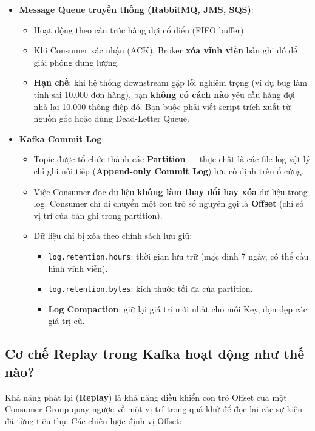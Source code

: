 \documentclass[12pt]{article}
\begin{document}
\begin{itemize}
    \item \textbf{Message Queue truyền thống (RabbitMQ, JMS, SQS)}:
    \begin{itemize}
        \item Hoạt động theo cấu trúc hàng đợi cổ điển (FIFO buffer).
        \item Khi Consumer xác nhận (ACK), Broker \textbf{xóa vĩnh viễn} bản ghi đó để giải phóng dung lượng.
        \item \textbf{Hạn chế}: khi hệ thống downstream gặp lỗi nghiêm trọng (ví dụ bug làm tính sai 10.000 đơn hàng), bạn \textbf{không có cách nào} yêu cầu hàng đợi nhả lại 10.000 thông điệp đó. Bạn buộc phải viết script trích xuất từ nguồn gốc hoặc dùng Dead-Letter Queue.
    \end{itemize}
    \item \textbf{Kafka Commit Log}:
    \begin{itemize}
        \item Topic được tổ chức thành các \textbf{Partition} --- thực chất là các file log vật lý chỉ ghi nối tiếp (\textbf{Append-only Commit Log}) lưu cố định trên ổ cứng.
        \item Việc Consumer đọc dữ liệu \textbf{không làm thay đổi hay xóa} dữ liệu trong log. Consumer chỉ di chuyển một con trỏ số nguyên gọi là \textbf{Offset} (chỉ số vị trí của bản ghi trong partition).
        \item Dữ liệu chỉ bị xóa theo chính sách lưu giữ:
        \begin{itemize}
            \item \texttt{log.retention.hours}: thời gian lưu trữ (mặc định 7 ngày, có thể cấu hình vĩnh viễn).
            \item \texttt{log.retention.bytes}: kích thước tối đa của partition.
            \item \textbf{Log Compaction}: giữ lại giá trị mới nhất cho mỗi Key, dọn dẹp các giá trị cũ.
        \end{itemize}
    \end{itemize}
\end{itemize}

\subsection{Cơ chế Replay trong Kafka hoạt động như thế nào?}

Khả năng phát lại (\textbf{Replay}) là khả năng điều khiển con trỏ Offset của một Consumer Group quay ngược về một vị trí trong quá khứ để đọc lại các sự kiện đã từng tiêu thụ. Các chiến lược định vị Offset:
\end{document}

